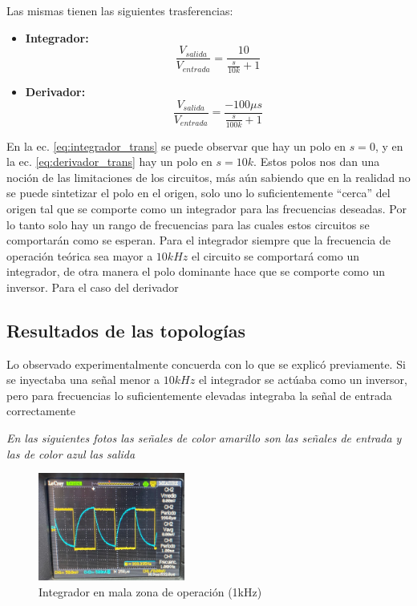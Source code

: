 \documentclass[letterpaper, 10 pt, conference]{ieeeconf}  %
\begin{document}
Las mismas tienen las siguientes trasferencias:
\begin{itemize}
  \item \textbf{Integrador:} 
    \begin{equation} \label{eq:integrador_trans}
      \frac{V_{salida}}{V_{entrada}} = \frac{10}{\frac{s}{10k} + 1}
    \end{equation}
  \item \textbf{Derivador:} 
    \begin{equation} \label{eq:derivador_trans}
      \frac{V_{salida}}{V_{entrada}} = \frac{-100\mu s}{ \frac{s}{100k} + 1}
    \end{equation}
\end{itemize}

En la ec. \ref{eq:integrador_trans} se puede observar que hay un polo en $s=0$, y en la ec. \ref{eq:derivador_trans} hay un polo en $s=10k$. Estos polos nos dan una noción de las limitaciones de los circuitos, más aún sabiendo que en la realidad no se puede sintetizar el polo en el origen, solo uno lo suficientemente ``cerca'' del origen tal que se comporte como un integrador para las frecuencias deseadas. Por lo tanto solo hay un rango de frecuencias para las cuales estos circuitos se comportarán como se esperan. Para el integrador siempre que la frecuencia de operación teórica sea mayor a $10kHz$ el circuito se comportará como un integrador, de otra manera el polo dominante hace que se comporte como un inversor. Para el caso del derivador 
\subsection{Resultados de las topologías}
Lo observado experimentalmente concuerda con lo que se explicó previamente. Si se inyectaba una señal menor a $10kHz$ el integrador se actúaba como un inversor, pero para frecuencias lo suficientemente elevadas integraba la señal de entrada correctamente

\textit{En las siguientes fotos las señales de color amarillo son las señales de entrada y las de color azul las salida}

\begin{figure}[H]
  \centering
  \includegraphics[width=0.43\textwidth]{./Imagenes/integrador_1khz.jpeg}
  \caption{Integrador en mala zona de operación (1kHz)}
  \label{pic:int_1khz}
\end{figure}
\end{document}
